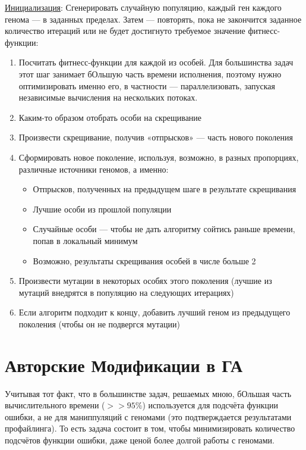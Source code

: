 \documentclass[11pt]{article}
\begin{document}
    \underline{Инициализация}: Сгенерировать случайную популяцию, каждый ген каждого генома — в заданных пределах.
    Затем — повторять, пока не закончится заданное количество итераций или не будет достигнуто требуемое значение фитнесс-функции:
    \begin{enumerate}
        \item Посчитать фитнесс-функции для каждой из особей.
        Для большинства задач этот шаг занимает бОльшую часть времени исполнения, поэтому нужно оптимизировать именно его, в частности — параллелизовать, запуская независимые вычисления на нескольких потоках.
        \item Каким-то образом отобрать особи на скрещивание
        \item Произвести скрещивание, получив «отпрысков» — часть нового поколения
        \item Сформировать новое поколение, используя, возможно, в разных пропорциях, различные источники геномов, а именно:
                \begin{itemize}
                    \item Отпрысков, полученных на предыдущем шаге в результате скрещивания
                    \item Лучшие особи из прошлой популяции
                    \item Случайные особи —  чтобы не дать алгоритму сойтись раньше времени, попав в локальный минимум
                    \item Возможно, результаты скрещивания особей в числе больше 2
                \end{itemize}
        \item Произвести мутации в некоторых особях этого поколения (лучшие из мутаций внедрятся в популяцию на следующих итерациях)
        \item Если алгоритм подходит к концу, добавить лучший геном из предыдущего поколения (чтобы он не подвергся мутации)
    \end{enumerate}

    \section{Авторские Модификации  в ГА}\label{sec:my_modifications}

    Учитывая тот факт, что в большинстве задач, решаемых мною, бОльшая часть вычислительного времени ($>> 95\%$) используется для подсчёта функции ошибки, а не для маниппуляций с геномами
    (это подтверждается результатами профайлинга).
    То есть задача состоит в том, чтобы минимизировать количество подсчётов функции ошибки, даже ценой более долгой работы с геномами.
\end{document}
